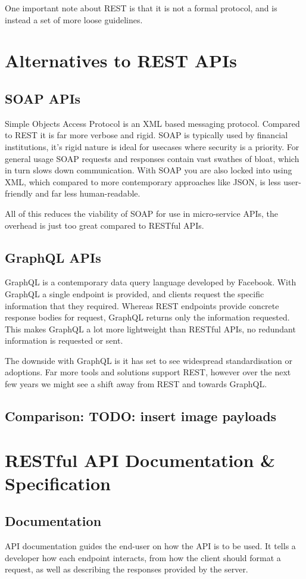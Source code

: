 One important note about REST is that it is not a formal protocol, and is instead a set of more loose guidelines. 

\section{Alternatives to REST APIs}
\subsection{SOAP APIs}
Simple Objects Access Protocol is an XML based messaging protocol. Compared to REST it is far more verbose and rigid. SOAP is typically used by financial institutions, it's rigid nature is ideal for usecases where security is  a priority. For general usage SOAP requests and responses contain vast swathes of bloat, which in turn slows down communication. With SOAP you are also locked into using XML, which compared to more contemporary approaches like JSON, is less user-friendly and far less human-readable.

All of this reduces the viability of SOAP for use in micro-service APIs, the overhead is just too great compared to RESTful APIs.

\subsection{GraphQL APIs}
GraphQL is a contemporary data query language developed by Facebook. With GraphQL a single endpoint is provided, and clients request the specific information that they required. Whereas REST endpoints provide concrete response bodies for request, GraphQL returns only the information requested. This makes GraphQL a lot more lightweight than RESTful APIs, no redundant information is requested or sent.

The downside with GraphQL is it has set to see widespread standardisation or adoptions. Far more tools and solutions support REST, however over the next few years we might see a shift away from REST and towards GraphQL. 
\subsection{Comparison: TODO: insert image payloads}
\section{RESTful API Documentation \& Specification}
\subsection{Documentation}
API documentation guides the end-user on how the API is to be used. It tells a developer how each endpoint interacts, from how the client should format a request, as well as describing the responses provided by the server.

